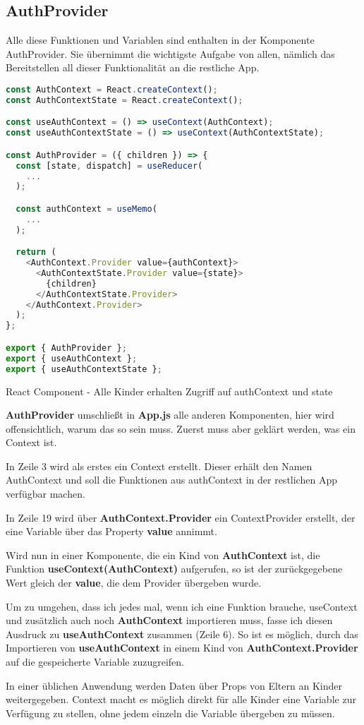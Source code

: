 \subsection{AuthProvider}
Alle diese Funktionen und Variablen sind enthalten in der Komponente AuthProvider. Sie übernimmt die
wichtigste Aufgabe von allen, nämlich das Bereitstellen all dieser Funktionalität an die restliche
App.

\begin{code}[htp]
\begin{lstlisting}[firstnumber=1,language=JavaScript, style=JSX]
const AuthContext = React.createContext();
const AuthContextState = React.createContext();

const useAuthContext = () => useContext(AuthContext);
const useAuthContextState = () => useContext(AuthContextState);

const AuthProvider = ({ children }) => {
  const [state, dispatch] = useReducer(
    ...
  );

  const authContext = useMemo(
    ...
  );

  return (
    <AuthContext.Provider value={authContext}>
      <AuthContextState.Provider value={state}>
        {children}
      </AuthContextState.Provider>
    </AuthContext.Provider>
  );
};

export { AuthProvider };
export { useAuthContext };
export { useAuthContextState };
\end{lstlisting}
\caption{React Component - Alle Kinder erhalten Zugriff auf authContext und state}
\end{code}

\textbf{AuthProvider} umschließt in \textbf{App.js} alle anderen Komponenten, hier wird
offensichtlich, warum das so sein muss. Zuerst muss aber geklärt werden, was ein Context ist.

In Zeile 3 wird als erstes ein Context erstellt. Dieser erhält den Namen AuthContext und soll die
Funktionen aus authContext in der restlichen App verfügbar machen.

In Zeile 19 wird über \textbf{AuthContext.Provider} ein ContextProvider erstellt, der eine Variable über das
Property \textbf{value} annimmt.

Wird nun in einer Komponente, die ein Kind von \textbf{AuthContext} ist, die Funktion
\textbf{useContext(AuthContext)} aufgerufen, so ist der zurückgegebene Wert gleich der \textbf{value}, die
dem Provider übergeben wurde.

\newpage
Um zu umgehen, dass ich jedes mal, wenn ich eine Funktion brauche, useContext und zusätzlich auch
noch \textbf{AuthContext} importieren muss, fasse ich diesen Ausdruck zu \textbf{useAuthContext}
zusammen (Zeile 6). So ist es möglich, durch das Importieren von \textbf{useAuthContext} in einem
Kind von \textbf{AuthContext.Provider} auf die gespeicherte Variable zuzugreifen.

In einer üblichen Anwendung werden Daten über Props von Eltern an Kinder weitergegeben. Context
macht es möglich direkt für alle Kinder eine Variable zur Verfügung zu stellen, ohne jedem einzeln
die Variable übergeben zu müssen.